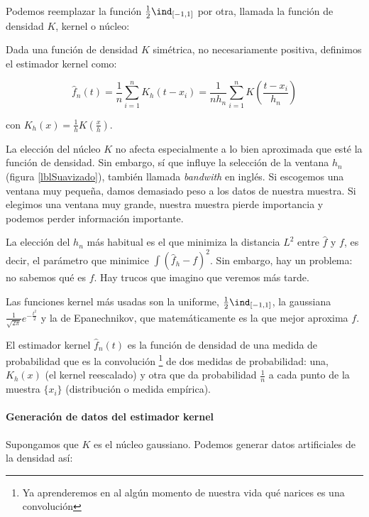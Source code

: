 \documentclass{apuntes}
\begin{document}
Podemos reemplazar la función $\frac{1}{2}\ind_{[-1, 1]}$ por otra, llamada la función de densidad $K$, kernel o núcleo:

\begin{defn}
Dada una función de densidad $K$ simétrica, no necesariamente positiva, definimos el estimador kernel como:

\[ \hat{f}_n(t) = \frac{1}{n}\sum_{i=1}^n K_h (t - x_i)  = \frac{1}{nh_n} \sum_{i=1}^n K\left(\frac{t-x_i}{h_n}\right) \]

con $K_h(x) = \frac{1}{h}K(\frac{x}{h})$.
\end{defn}

La elección del núcleo $K$ no afecta especialmente a lo bien aproximada que esté la función de densidad. Sin embargo, sí que influye la selección de la ventana $h_n$ (figura \ref{lblSuavizado}), también llamada \textit{bandwith} en inglés.  Si escogemos una ventana muy pequeña, damos demasiado peso a los datos de nuestra muestra. Si elegimos una ventana muy grande, nuestra muestra pierde importancia y podemos perder información importante.

La elección del $h_n$ más habitual es el que minimiza la distancia $L^2$ entre $\hat{f}$ y $f$, es decir, el parámetro que minimice $\displaystyle\int\left(\hat{f}_h-f\right)^2$. Sin embargo, hay un problema: no sabemos qué es $f$. Hay trucos que imagino que veremos más tarde.


Las funciones kernel más usadas son la uniforme, $\frac{1}{2}\ind_{[-1, 1]}$, la gaussiana $\frac{1}{\sqrt{2 \pi}}e^{-\frac{t^2}{2}}$ y la de Epanechnikov, que matemáticamente es la que mejor aproxima $f$.

El estimador kernel $\hat{f}_n(t)$ es la función de densidad de una medida de probabilidad que es la convolución \footnote{Ya aprenderemos en al algún momento de nuestra vida qué narices es una convolución} de dos medidas de probabilidad: una, $K_h(x)$ (el kernel reescalado) y otra que da probabilidad $\frac{1}{n}$ a cada punto de la muestra $\{x_i\}$ (distribución o medida empírica).

\paragraph{Generación de datos del estimador kernel} Supongamos que $K$ es el núcleo gaussiano. Podemos generar datos artificiales de la densidad así:
\end{document}
